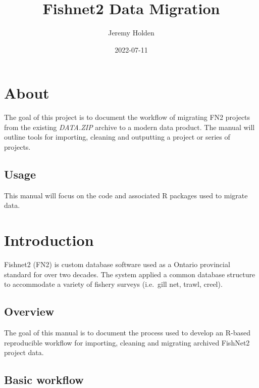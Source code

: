 \documentclass[
]{book}
\title{Fishnet2 Data Migration}
\author{Jeremy Holden}
\date{2022-07-11}
\begin{document}
\maketitle

{
\setcounter{tocdepth}{1}
\tableofcontents
}
\hypertarget{about}{%
\chapter{About}\label{about}}

The goal of this project is to document the workflow of migrating FN2 projects from the existing \emph{DATA.ZIP} archive to a modern data product. The manual will outline tools for importing, cleaning and outputting a project or series of projects.

\hypertarget{usage}{%
\section{Usage}\label{usage}}

This manual will focus on the code and associated R packages used to migrate data.

\hypertarget{introduction}{%
\chapter{Introduction}\label{introduction}}

Fishnet2 (FN2) is custom database software used as a Ontario provincial standard for over two decades. The system applied a common database structure to accommodate a variety of fishery surveys (i.e.~gill net, trawl, creel).

\hypertarget{overview}{%
\section{Overview}\label{overview}}

The goal of this manual is to document the process used to develop an R-based reproducible workflow for importing, cleaning and migrating archived FishNet2 project data.

\hypertarget{basic-workflow}{%
\section{Basic workflow}\label{basic-workflow}}
\end{document}
